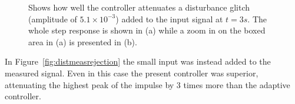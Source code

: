 \begin{figure}[h!]
  \centering %
  \qquad
  \caption{\label{fig:distrejection} Shows how well the controller attenuates a disturbance glitch (amplitude of $5.1 \times 10^{-3}$) added to the input signal at $t=3s$. The whole step response is shown in (a) while a zoom in on the boxed area in (a) is presented in (b).}
\end{figure}

In Figure~\ref{fig:distmeasrejection} the small input was instead added to the measured signal. Even in this case the present controller was superior, attenuating the highest peak of the impulse by 3 times more than the adaptive controller.

